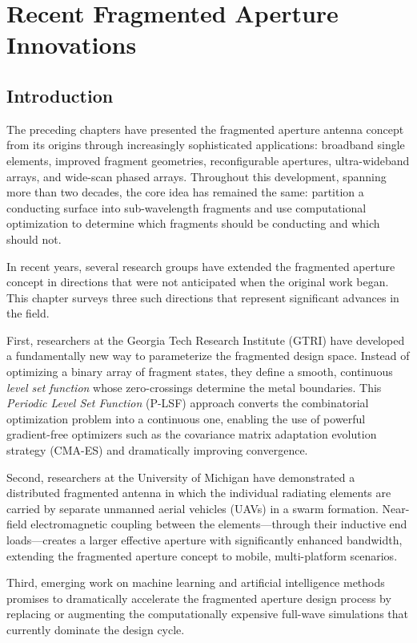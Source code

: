 \chapter{Recent Fragmented Aperture Innovations}

\section{Introduction}

The preceding chapters have presented the fragmented aperture antenna concept from its origins through increasingly sophisticated applications: broadband single elements, improved fragment geometries, reconfigurable apertures, ultra-wideband arrays, and wide-scan phased arrays.  Throughout this development, spanning more than two decades, the core idea has remained the same: partition a conducting surface into sub-wavelength fragments and use computational optimization to determine which fragments should be conducting and which should not.

In recent years, several research groups have extended the fragmented aperture concept in directions that were not anticipated when the original work began.  This chapter surveys three such directions that represent significant advances in the field.

First, researchers at the Georgia Tech Research Institute (GTRI) have developed a fundamentally new way to parameterize the fragmented design space.  Instead of optimizing a binary array of fragment states, they define a smooth, continuous \emph{level set function} whose zero-crossings determine the metal boundaries.  This \emph{Periodic Level Set Function} (P-LSF) approach converts the combinatorial optimization problem into a continuous one, enabling the use of powerful gradient-free optimizers such as the covariance matrix adaptation evolution strategy (CMA-ES) and dramatically improving convergence.

Second, researchers at the University of Michigan have demonstrated a distributed fragmented antenna in which the individual radiating elements are carried by separate unmanned aerial vehicles (UAVs) in a swarm formation.  Near-field electromagnetic coupling between the elements---through their inductive end loads---creates a larger effective aperture with significantly enhanced bandwidth, extending the fragmented aperture concept to mobile, multi-platform scenarios.

Third, emerging work on machine learning and artificial intelligence methods promises to dramatically accelerate the fragmented aperture design process by replacing or augmenting the computationally expensive full-wave simulations that currently dominate the design cycle.

